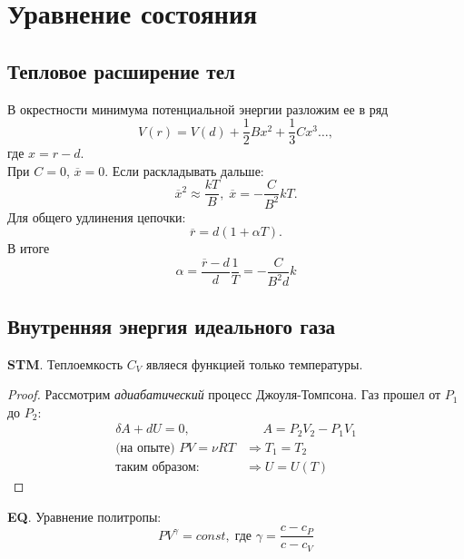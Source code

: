 \section{Уравнение состояния}



\subsection{Тепловое расширение тел}
В окрестности минимума потенциальной энергии разложим ее в ряд 
$$ V(r) = V(d) + \frac{1}{2}B x^2 + \frac{1}{3}C x^3 \dots , $$
где $x = r - d$.\\

При $C=0$, $\overline x = 0$.
Если раскладывать дальше:
$$\overline x^2 \approx \frac{k T}{B}, \;  \overline x = - \frac{C}{B^2}k T.$$
Для общего удлинения цепочки:
$$ \overline r = d(1 + \alpha T).$$
В итоге
$$\alpha = \frac{\overline r - d}{d}\frac{1}{T} = -\frac{C}{B^2 d} k$$





\subsection{Внутренняя энергия идеального газа}
\noindent
\textbf{STM}. Теплоемкость $C_V$ являеся функцией только температуры.
\begin{proof}
    Рассмотрим \textit{адиабатический} процесс Джоуля-Томпсона. Газ прошел от $P_1$ до $P_2$:
    \begin{align*}
        \delta A + dU  = 0, & \; \; \; \; \; A = P_2 V_2 - P_1 V_1 \\
        \text{(на опыте) } PV = \nu R T &\Rightarrow T_1 = T_2 \\
        \text{таким образом: } & \Rightarrow U = U(T)
    \end{align*}
\end{proof}

\noindent
\textbf{EQ}. Уравнение политропы:
\begin{equation}
    P V^{ \gamma } = const, \; \text{где } \gamma = \frac{c - c_P}{c - c_V}
\end{equation}



